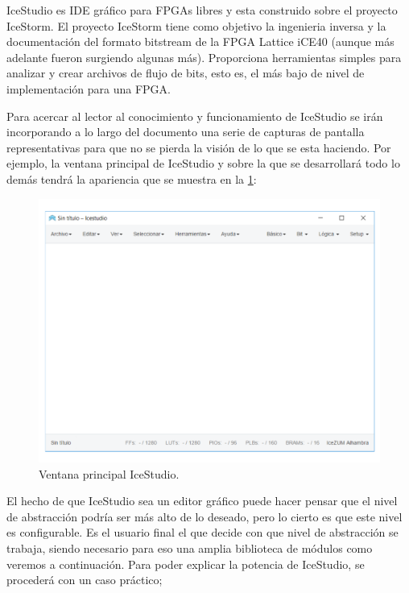 IceStudio es IDE gráfico para FPGAs libres y esta construido sobre el proyecto IceStorm. 
El proyecto IceStorm tiene como objetivo la ingenieria inversa y la documentación del formato bitstream de la FPGA Lattice iCE40 (aunque más adelante fueron surgiendo algunas más). Proporciona herramientas simples para analizar y crear archivos de flujo de bits, esto es, el más bajo de nivel de implementación para una FPGA.\newline

Para acercar al lector al conocimiento y funcionamiento de IceStudio se irán incorporando a lo largo del documento una serie de capturas de pantalla representativas para que no se pierda la visión de lo que se esta haciendo. Por ejemplo, la ventana principal de IceStudio y sobre la que se desarrollará todo lo demás tendrá la apariencia que se muestra en la \ref{fig:Main_IceStudio}: \newline

\begin{figure}[H]
	\center
	\includegraphics[trim = 0mm 20mm 0mm 0mm, clip,scale=0.4]{imagenes/EstadoArte/Main_IceStudio.pdf}
	\caption{Ventana principal IceStudio.}
	\label{fig:Main_IceStudio}
\end{figure}

El hecho de que IceStudio sea un editor gráfico puede hacer pensar que el nivel de abstracción podría ser más alto de lo deseado, pero lo cierto es que este nivel es configurable. \newline
Es el usuario final el que decide con que nivel de abstracción se trabaja, siendo necesario para eso una amplia biblioteca de módulos como veremos a continuación. Para poder explicar la potencia de IceStudio, se procederá con un caso práctico;\newline

